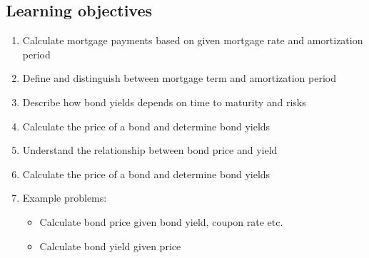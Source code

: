 \subsection{Learning objectives}
\begin{definition}
    \begin{enumerate}
        \item Calculate mortgage payments based on given mortgage rate and amortization period
        \item Define and distinguish between mortgage term and amortization period
        \item Describe how bond yields depends on time to maturity and risks
        \item Calculate the price of a bond and determine bond yields
        \item Understand the relationship between bond price and yield
        \item Calculate the price of a bond and determine bond yields
        \item Example problems:
        \begin{itemize}
            \item Calculate bond price given bond yield, coupon rate etc.
            \item Calculate bond yield given price
        \end{itemize}
    \end{enumerate}
\end{definition}


